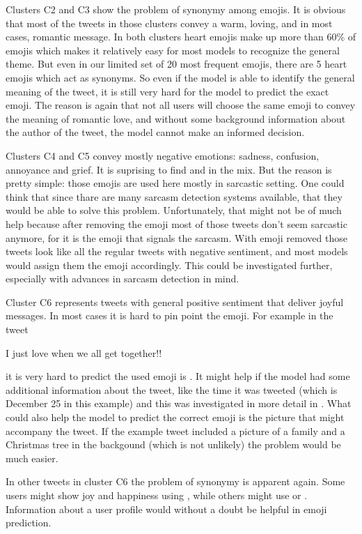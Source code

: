 \documentclass[10pt, a4paper]{article}
\begin{document}
Clusters C2 and C3 show the problem of synonymy among emojis. It is obvious that
most of the tweets in those clusters convey a warm, loving, and in most cases, 
romantic message. In both clusters heart emojis make up more than 60\% of emojis
which makes it relatively easy for most models to recognize the general theme. 
But even in our limited set of 20 most frequent emojis, there are 5 heart emojis
which act as synonyms. So even if the model is able to identify the general 
meaning of the tweet, it is still very hard for the model to predict the exact 
emoji. The reason is again that not all users will choose the same emoji to 
convey the meaning of romantic love, and without some background information 
about the author of the tweet, the model cannot make an informed decision.

Clusters C4 and C5 convey mostly negative emotions: sadness, confusion, 
annoyance and grief. It is suprising to find  and  in 
the mix. But the reason is pretty simple: those emojis are used here mostly in 
sarcastic setting. One could think that since thare are many sarcasm detection 
systems available, that they would be able to solve this problem. Unfortunately,
that might not be of much help because after removing the emoji most of those 
tweets don't seem sarcastic anymore, for it is the emoji that signals the 
sarcasm. With emoji removed those tweets look like all the regular tweets with 
negative sentiment, and most models would assign them the emoji accordingly. 
This could be investigated further, especially with advances in sarcasm 
detection in mind.

Cluster C6 represents tweets with general positive sentiment that deliver joyful
messages. In most cases it is hard to pin point the emoji. For example in the 
tweet
\begin{displayquote}
I just love when we all get together!! 
\end{displayquote}
it is very hard to predict the used emoji is . It might help if the 
model had some additional information about the tweet, like the time it was 
tweeted (which is December 25 in this example) and this was investigated in more
detail in \citep{barbieri2018exploring}. What could also help the model to 
predict the correct emoji is the picture that might accompany the tweet. If the 
example tweet included a picture of a family and a Christmas tree in the 
backgound (which is not unlikely) the problem would be much easier.

In other tweets in cluster C6 the problem of synonymy is apparent again. Some 
users might show joy and happiness using , while others might use
 or . Information about a user profile would without a
doubt be helpful in emoji prediction.
\end{document}
